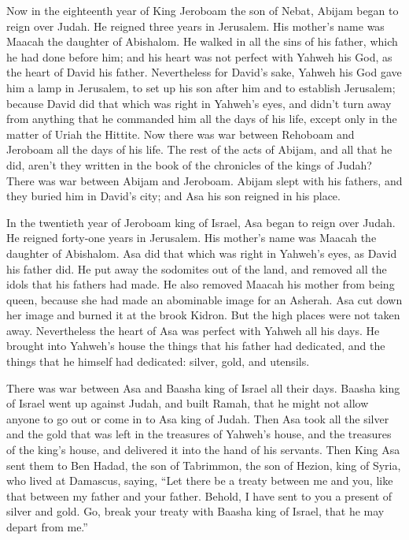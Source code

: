  Now in the eighteenth year of King Jeroboam the son of
Nebat, Abijam began to reign over Judah.  He reigned three
years in Jerusalem. His mother's name was Maacah the daughter of
Abishalom.  He walked in all the sins of his father, which
he had done before him; and his heart was not perfect with Yahweh his
God, as the heart of David his father.  Nevertheless for
David's sake, Yahweh his God gave him a lamp in Jerusalem, to set up his
son after him and to establish Jerusalem;  because David
did that which was right in Yahweh's eyes, and didn't turn away from
anything that he commanded him all the days of his life, except only in
the matter of Uriah the Hittite.  Now there was war
between Rehoboam and Jeroboam all the days of his life. 
The rest of the acts of Abijam, and all that he did, aren't they written
in the book of the chronicles of the kings of Judah? There was war
between Abijam and Jeroboam.  Abijam slept with his
fathers, and they buried him in David's city; and Asa his son reigned in
his place.

 In the twentieth year of Jeroboam king of Israel, Asa
began to reign over Judah.  He reigned forty-one years in
Jerusalem. His mother's name was Maacah the daughter of Abishalom.
 Asa did that which was right in Yahweh's eyes, as David
his father did.  He put away the sodomites out of the
land, and removed all the idols that his fathers had made.
 He also removed Maacah his mother from being queen,
because she had made an abominable image for an Asherah. Asa cut down
her image and burned it at the brook Kidron.  But the
high places were not taken away. Nevertheless the heart of Asa was
perfect with Yahweh all his days.  He brought into
Yahweh's house the things that his father had dedicated, and the things
that he himself had dedicated: silver, gold, and utensils.

 There was war between Asa and Baasha king of Israel all
their days.  Baasha king of Israel went up against Judah,
and built Ramah, that he might not allow anyone to go out or come in to
Asa king of Judah.  Then Asa took all the silver and the
gold that was left in the treasures of Yahweh's house, and the treasures
of the king's house, and delivered it into the hand of his servants.
Then King Asa sent them to Ben Hadad, the son of Tabrimmon, the son of
Hezion, king of Syria, who lived at Damascus, saying, 
``Let there be a treaty between me and you, like that between my father
and your father. Behold, I have sent to you a present of silver and
gold. Go, break your treaty with Baasha king of Israel, that he may
depart from me.''

